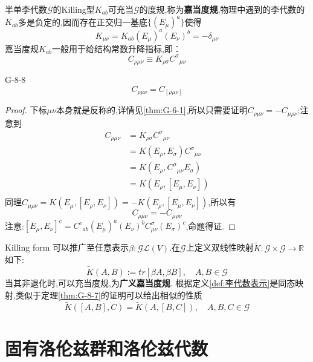 \documentclass[../main.tex]{subfiles}
\begin{document}
半单李代数$\mathscr{G}$的Killing型$K_{ab}$可充当$\mathscr{G}$的度规,称为\textbf{嘉当度规},物理中遇到的李代数的$K_{ab}$多是负定的,因而存在正交归一基底$\{(E_\mu)^a\}$使得$$
	K_{\mu\nu} = K_{ab} (E_\mu)^a(E_\nu)^b = -\delta_{\mu\nu}$$
嘉当度规$K_{ab}$一般用于给结构常数升降指标,即：
$$
	C_{\rho\mu\nu} \equiv K_{\rho\sigma}C^{\sigma}{}_{\mu \nu}
$$
\begin{theorem}
  {}{G-8-8}
	$$
		C_{\rho \mu \nu} = C_{[\rho \mu \nu]}$$

\end{theorem}
\begin{proof}
	下标$\mu\nu$本身就是反称的,详情见\ref{thm:G-6-1},所以只需要证明$C_{\rho \mu \nu} = - C_{\mu\rho \nu}$;注意到
	\begin{align*}
		C_{\rho \mu \nu} & = K_{\rho\sigma}C^\sigma{}_{\mu\nu}      \\
		                 & = K(E_\rho ,E_\sigma)C^\sigma{}_{\mu\nu} \\
		                 & = K(E_\rho, C^\sigma{}_{\mu\nu}E_\sigma) \\
		                 & = K(E_\rho, [E_\mu,E_\nu])               \\
	\end{align*}
	同理$C_{\mu\rho\nu} = K(E_\mu,[E_\rho,E_\nu]) = -K(E_\rho,[E_\mu,E_\nu])$,所以有$$
		C_{\rho \mu \nu} = -C_{\mu\rho\nu}
	$$
	注意:$[E_\mu,E_\nu]^c = C^c{}_{ab} (E_\mu)^a (E_\nu)^b C^\sigma_{\mu\nu} (E_\sigma)^c$,命题得证.
\end{proof}

Killing form 可以推广至任意表示$\beta: \mathscr{G}\mathscr{L}(V) $.在$\mathscr{G}$上定义双线性映射$\tilde{K}:\mathscr{G}\times \mathscr{G} \rightarrow \mathbb{R}$如下:$$
	\tilde{K}(A,B) := tr[\beta{A},\beta{B}],\quad A,B \in \mathscr{G}$$当其非退化时,可以充当度规,为\textbf{广义嘉当度规}.
根据定义\ref{def:李代数表示}是同态映射,类似于定理\ref{thm:G-8-7}的证明可以给出相似的性质$$
	\tilde{K} ([A,B],C) = \tilde{K}(A,[B,C]), \quad A,B,C \in \mathscr{G}$$
\chapter{固有洛伦兹群和洛伦兹代数}
\end{document}
